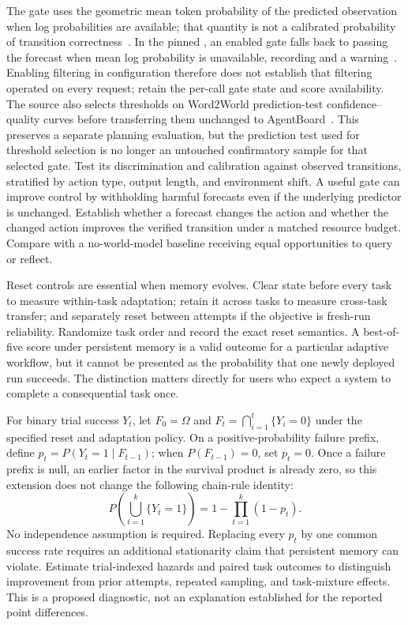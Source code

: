 The gate uses the geometric mean token probability of the predicted observation when log probabilities are available; that quantity is not a calibrated probability of transition correctness~\cite{rewrite_worldevolver2026}. In the pinned , an enabled gate falls back to passing the forecast when mean log probability is unavailable, recording  and a warning~\cite{rewrite_worldevolver_repo}. Enabling filtering in configuration therefore does not establish that filtering operated on every request; retain the per-call gate state and score availability. The source also selects thresholds on Word2World prediction-test confidence--quality curves before transferring them unchanged to AgentBoard~\cite{rewrite_worldevolver2026}. This preserves a separate planning evaluation, but the prediction test used for threshold selection is no longer an untouched confirmatory sample for that selected gate. Test its discrimination and calibration against observed transitions, stratified by action type, output length, and environment shift. A useful gate can improve control by withholding harmful forecasts even if the underlying predictor is unchanged. Establish whether a forecast changes the action and whether the changed action improves the verified transition under a matched resource budget. Compare with a no-world-model baseline receiving equal opportunities to query or reflect.

Reset controls are essential when memory evolves. Clear state before every task to measure within-task adaptation; retain it across tasks to measure cross-task transfer; and separately reset between attempts if the objective is fresh-run reliability. Randomize task order and record the exact reset semantics. A best-of-five score under persistent memory is a valid outcome for a particular adaptive workflow, but it cannot be presented as the probability that one newly deployed run succeeds. The distinction matters directly for users who expect a system to complete a consequential task once.

For binary trial success $Y_t$, let $F_0=\Omega$ and $F_t=\bigcap_{i=1}^{t}\{Y_i=0\}$ under the specified reset and adaptation policy. On a positive-probability failure prefix, define $p_t=P(Y_t=1\mid F_{t-1})$; when $P(F_{t-1})=0$, set $p_t=0$. Once a failure prefix is null, an earlier factor in the survival product is already zero, so this extension does not change the following chain-rule identity:
\begin{equation}
 P\!\left(\bigcup_{t=1}^{k}\{Y_t=1\}\right)
 =1-\prod_{t=1}^{k}(1-p_t).
\end{equation}
No independence assumption is required. Replacing every $p_t$ by one common success rate requires an additional stationarity claim that persistent memory can violate. Estimate trial-indexed hazards and paired task outcomes to distinguish improvement from prior attempts, repeated sampling, and task-mixture effects. This is a proposed diagnostic, not an explanation established for the reported point differences.

